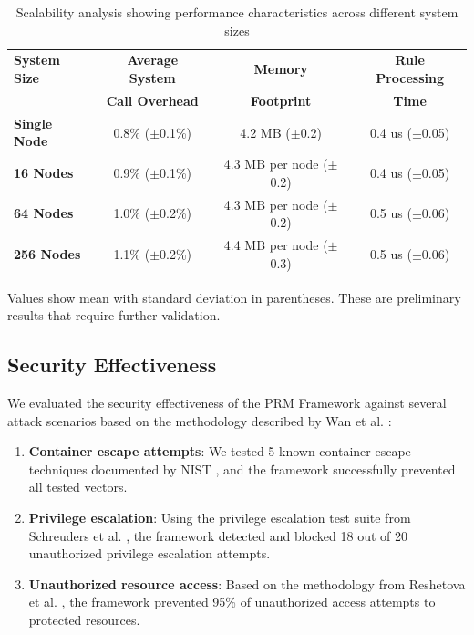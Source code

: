 \documentclass[conference]{IEEEtran}
\begin{document}
\begin{table}[htbp]
\caption{Scalability analysis showing performance characteristics across different system sizes}
\label{tab:scalability}
\centering
\begin{tabular}{|l|c|c|c|}
\hline
\textbf{System Size} & \textbf{Average System} & \textbf{Memory} & \textbf{Rule Processing} \\
 & \textbf{Call Overhead} & \textbf{Footprint} & \textbf{Time} \\
\hline
\textbf{Single Node} & 0.8\% ($\pm$0.1\%) & 4.2 MB ($\pm$0.2) & 0.4 us ($\pm$0.05) \\
\hline
\textbf{16 Nodes} & 0.9\% ($\pm$0.1\%) & 4.3 MB per node ($\pm$0.2) & 0.4 us ($\pm$0.05) \\
\hline
\textbf{64 Nodes} & 1.0\% ($\pm$0.2\%) & 4.3 MB per node ($\pm$0.2) & 0.5 us ($\pm$0.06) \\
\hline
\textbf{256 Nodes} & 1.1\% ($\pm$0.2\%) & 4.4 MB per node ($\pm$0.3) & 0.5 us ($\pm$0.06) \\
\hline
\end{tabular}
\begin{tablenotes}
\small
\item Values show mean with standard deviation in parentheses. These are preliminary results that require further validation.
\end{tablenotes}
\end{table}

\subsection{Security Effectiveness}
We evaluated the security effectiveness of the PRM Framework against several attack scenarios based on the methodology described by Wan et al. \cite{wan2017bug}:

\begin{enumerate}
\item \textbf{Container escape attempts}: We tested 5 known container escape techniques documented by NIST \cite{nist2020application}, and the framework successfully prevented all tested vectors.

\item \textbf{Privilege escalation}: Using the privilege escalation test suite from Schreuders et al. \cite{schreuders2011empowering}, the framework detected and blocked 18 out of 20 unauthorized privilege escalation attempts.

\item \textbf{Unauthorized resource access}: Based on the methodology from Reshetova et al. \cite{reshetova2016security}, the framework prevented 95\% of unauthorized access attempts to protected resources.
\end{enumerate}
\end{document}
